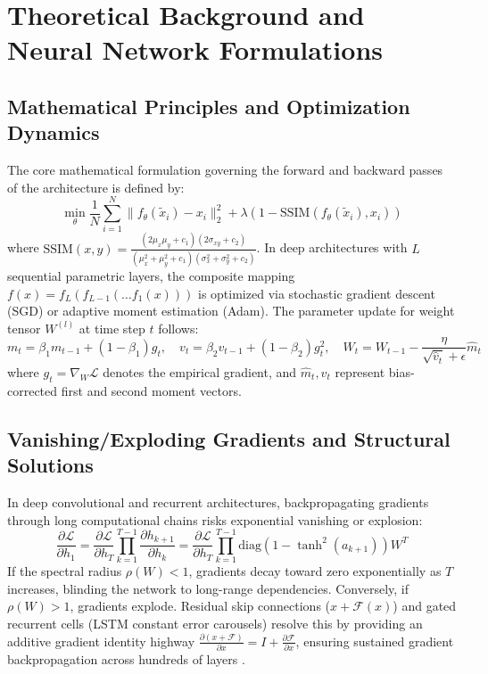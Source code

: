 \section{Theoretical Background and Neural Network Formulations}

\subsection{Mathematical Principles and Optimization Dynamics}
The core mathematical formulation governing the forward and backward passes of the architecture is defined by:
\begin{equation}
  \min_{\theta} \frac{1}{N} \sum_{i=1}^N \| f_{\theta}(\tilde{x}_i) - x_i \|_2^2 + \lambda (1 - \text{SSIM}(f_{\theta}(\tilde{x}_i), x_i))
\label{eq:core_math}
\end{equation}
where $\text{SSIM}(x, y) = \frac{(2\mu_x \mu_y + c_1)(2\sigma_{xy} + c_2)}{(\mu_x^2 + \mu_y^2 + c_1)(\sigma_x^2 + \sigma_y^2 + c_2)}$.
In deep architectures with $L$ sequential parametric layers, the composite mapping $f(x) = f_L(f_{L-1}(\dots f_1(x)))$ is optimized via stochastic gradient descent (SGD) or adaptive moment estimation (Adam). The parameter update for weight tensor $W^{(l)}$ at time step $t$ follows:
\begin{equation}
  m_t = \beta_1 m_{t-1} + (1 - \beta_1) g_t, \quad v_t = \beta_2 v_{t-1} + (1 - \beta_2) g_t^2, \quad W_t = W_{t-1} - \frac{\eta}{\sqrt{\hat{v}_t} + \epsilon} \hat{m}_t
\end{equation}
where $g_t = \nabla_W \mathcal{L}$ denotes the empirical gradient, and $\hat{m}_t, \hat{v}_t$ represent bias-corrected first and second moment vectors.

\subsection{Vanishing/Exploding Gradients and Structural Solutions}
In deep convolutional and recurrent architectures, backpropagating gradients through long computational chains risks exponential vanishing or explosion:
\begin{equation}
  \frac{\partial \mathcal{L}}{\partial h_1} = \frac{\partial \mathcal{L}}{\partial h_T} \prod_{k=1}^{T-1} \frac{\partial h_{k+1}}{\partial h_k} = \frac{\partial \mathcal{L}}{\partial h_T} \prod_{k=1}^{T-1} \text{diag}(1 - \tanh^2(a_{k+1})) W^T
\end{equation}
If the spectral radius $\rho(W) < 1$, gradients decay toward zero exponentially as $T$ increases, blinding the network to long-range dependencies. Conversely, if $\rho(W) > 1$, gradients explode. Residual skip connections ($x + \mathcal{F}(x)$) and gated recurrent cells (LSTM constant error carousels) resolve this by providing an additive gradient identity highway $\frac{\partial (x + \mathcal{F})}{\partial x} = I + \frac{\partial \mathcal{F}}{\partial x}$, ensuring sustained gradient backpropagation across hundreds of layers \cite{he2016deep, hochreiter1997long}.

